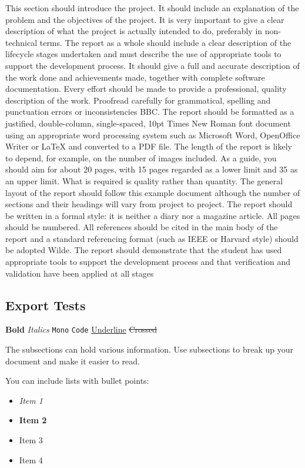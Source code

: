 \documentclass[twocolumn]{article}
\begin{document}
This section should introduce the project.
It should include an explanation of the problem and the objectives of the project.
It is very important to give a clear description of what the project is actually intended to do, preferably in non-technical terms.
The report as a whole should include a clear description of the lifecycle stages undertaken and must describe the use of appropriate tools to support the development process.
It should give a full and accurate description of the work done and achievements made, together with complete software documentation.
Every effort should be made to provide a professional, quality description of the work.
Proofread carefully for grammatical, spelling and punctuation errors or inconsistencies BBC.
The report should be formatted as a justified, double-column, single-spaced, 10pt Times New Roman font document using an appropriate word processing system such as Microsoft Word, OpenOffice Writer or \LaTeX{} and converted to a PDF file.
The length of the report is likely to depend, for example, on the number of images included.
As a guide, you should aim for about 20 pages, with 15 pages regarded as a lower limit and 35 as an upper limit.
What is required is quality rather than quantity.
The general layout of the report should follow this example document although the number of sections and their headings will vary from project to project.
The report should be written in a formal style: it is neither a diary nor a magazine article.
All pages should be numbered.
All references should be cited in the main body of the report and a standard referencing format (such as IEEE or Harvard style) should be adopted Wilde.
The report should demonstrate that the student has used appropriate tools to support the development process and that verification and validation have been applied at all stages

\subsection{Export Tests}
\label{sec:orgc6621a3}

\textbf{Bold}
\emph{Italics}
\texttt{Mono}
\texttt{Code}
\uline{Underline}
\sout{Crossed}

The subsections can hold various information.
Use subsections to break up your document and make it easier to read.

You can include lists with bullet points:
\begin{itemize}
\item \emph{Item 1}
\item \textbf{Item 2}
\item Item 3
\item Item 4
\end{itemize}
\end{document}
